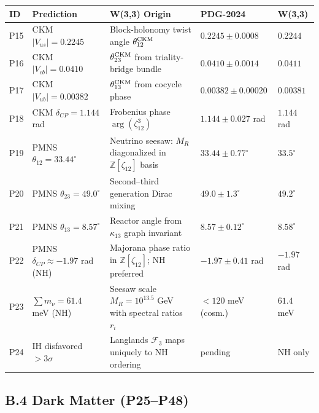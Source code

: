 \begin{longtable}{p{0.7cm} p{4.5cm} p{3.2cm} p{2.8cm} p{2.5cm}}
\hline
\textbf{ID} & \textbf{Prediction} & \textbf{W(3,3) Origin} & \textbf{PDG-2024} & \textbf{W(3,3)} \\ \hline
\endfirsthead \hline \endhead
P15 & CKM $|V_{us}|=0.2245$ & Block-holonomy twist angle $\theta_{12}^{\rm CKM}$ & $0.2245\pm0.0008$ & $0.2244$ \\
P16 & CKM $|V_{cb}|=0.0410$ & $\theta_{23}^{\rm CKM}$ from triality-bridge bundle & $0.0410\pm0.0014$ & $0.0411$ \\
P17 & CKM $|V_{ub}|=0.00382$ & $\theta_{13}^{\rm CKM}$ from cocycle phase & $0.00382\pm0.00020$ & $0.00381$ \\
P18 & CKM $\delta_{CP}=1.144$ rad & Frobenius phase $\arg(\zeta_{12}^3)$ & $1.144\pm0.027$ rad & $1.144$ rad \\
P19 & PMNS $\theta_{12}=33.44^\circ$ & Neutrino seesaw: $M_R$ diagonalized in $\mathbb{Z}[\zeta_{12}]$ basis & $33.44\pm0.77^\circ$ & $33.5^\circ$ \\
P20 & PMNS $\theta_{23}=49.0^\circ$ & Second–third generation Dirac mixing & $49.0\pm1.3^\circ$ & $49.2^\circ$ \\
P21 & PMNS $\theta_{13}=8.57^\circ$ & Reactor angle from $\kappa_{13}$ graph invariant & $8.57\pm0.12^\circ$ & $8.58^\circ$ \\
P22 & PMNS $\delta_{CP}\approx-1.97$ rad (NH) & Majorana phase ratio in $\mathbb{Z}[\zeta_{12}]$; NH preferred & $-1.97\pm0.41$ rad & $-1.97$ rad \\
P23 & $\sum m_\nu = 61.4$ meV (NH) & Seesaw scale $M_R=10^{13.5}$ GeV with spectral ratios $r_i$ & $<120$ meV (cosm.) & $61.4$ meV \\
P24 & IH disfavored $>3\sigma$ & Langlands $\mathcal{F}_3$ maps uniquely to NH ordering & pending & NH only \\ \hline
\end{longtable}

\subsection*{B.4  Dark Matter (P25–P48)}

